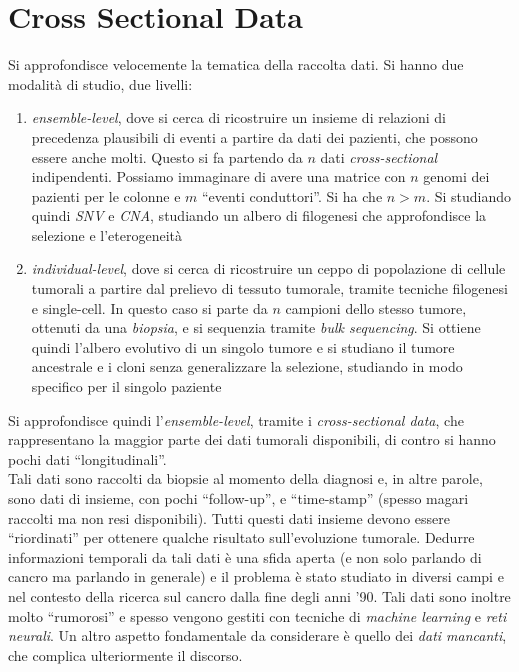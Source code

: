 \documentclass[a4paper,12pt, oneside]{book}
\begin{document}
\section{Cross Sectional Data}
Si approfondisce velocemente la tematica della raccolta dati. Si hanno due
modalità di studio, due livelli:
\begin{enumerate}
  \item \textit{ensemble-level}, dove si cerca di ricostruire un insieme di
  relazioni 
  di precedenza plausibili di eventi a partire da dati dei pazienti, che
  possono essere anche molti. Questo si fa partendo da $n$ dati
  \textit{cross-sectional} indipendenti. Possiamo immaginare di avere una
  matrice con $n$ genomi dei pazienti per le colonne e $m$ ``eventi
  conduttori''. Si ha che $n>m$. Si studiando quindi \textit{SNV} e
  \textit{CNA}, studiando un albero di filogenesi che approfondisce la selezione
  e l'eterogeneità
  \item \textit{individual-level}, dove si cerca di ricostruire un ceppo di
  popolazione di cellule tumorali a partire dal prelievo di tessuto tumorale,
  tramite tecniche filogenesi e single-cell. In questo caso si parte da $n$
  campioni dello stesso tumore, ottenuti da una \textit{biopsia}, e si sequenzia
  tramite \textit{bulk sequencing}. Si ottiene quindi l'albero evolutivo di un
  singolo tumore e si studiano il tumore ancestrale e i cloni senza
  generalizzare la selezione, studiando in modo specifico per il singolo
  paziente 
\end{enumerate}
Si approfondisce quindi l'\textit{ensemble-level}, tramite i
\textit{cross-sectional data}, che rappresentano la maggior parte dei dati
tumorali disponibili, di contro si hanno pochi dati ``longitudinali''. \\
Tali dati sono raccolti da biopsie al momento della diagnosi e, in altre parole,
sono dati di insieme, con pochi ``follow-up'', e ``time-stamp'' (spesso magari
raccolti ma non resi disponibili). Tutti questi dati insieme devono essere
``riordinati'' per ottenere qualche risultato sull'evoluzione tumorale. Dedurre
informazioni temporali da tali dati è una sfida aperta (e non solo parlando di
cancro ma parlando in generale) e il problema è stato
studiato in diversi campi e nel contesto della ricerca sul cancro dalla fine
degli anni '90. Tali dati sono inoltre molto ``rumorosi'' e spesso vengono
gestiti con tecniche di \textit{machine learning} e \textit{reti
  neurali}. Un altro aspetto fondamentale da considerare è quello dei
\textit{dati mancanti}, che complica ulteriormente il discorso.\\
\end{document}
